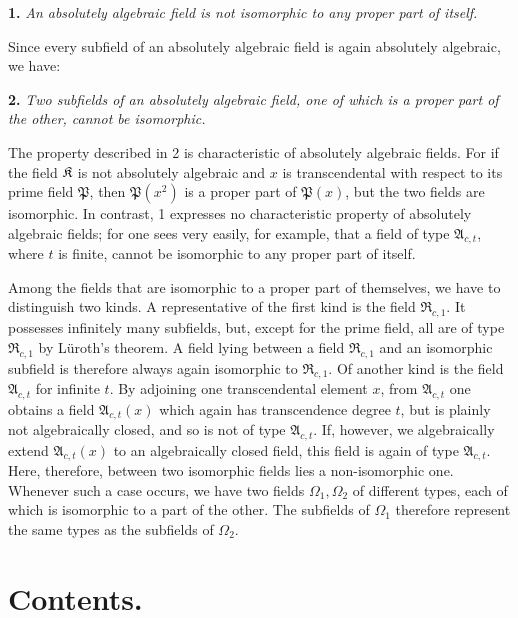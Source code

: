 \textbf{1.} \emph{An absolutely algebraic field is not isomorphic to any proper part of itself.}

Since every subfield of an absolutely algebraic field is again absolutely algebraic, we have:

\textbf{2.} \emph{Two subfields of an absolutely algebraic field, one of which is a proper part of the other, cannot be isomorphic.}

The property described in 2 is characteristic of absolutely algebraic fields. For if the field \(\mathfrak K\) is not absolutely algebraic and \(x\) is transcendental with respect to its prime field \(\mathfrak P\), then \(\mathfrak P(x^2)\) is a proper part of \(\mathfrak P(x)\), but the two fields are isomorphic. In contrast, 1 expresses no characteristic property of absolutely algebraic fields; for one sees very easily, for example, that a field of type \(\mathfrak A_{c,t}\), where \(t\) is finite, cannot be isomorphic to any proper part of itself.

Among the fields that are isomorphic to a proper part of themselves, we have to distinguish two kinds. A representative of the first kind is the field \(\mathfrak R_{c,1}\). It possesses infinitely many subfields, but, except for the prime field, all are of type \(\mathfrak R_{c,1}\) by Lüroth's theorem. A field lying between a field \(\mathfrak R_{c,1}\) and an isomorphic subfield is therefore always again isomorphic to \(\mathfrak R_{c,1}\). Of another kind is the field \(\mathfrak A_{c,t}\) for infinite \(t\). By adjoining one transcendental element \(x\), from \(\mathfrak A_{c,t}\) one obtains a field \(\mathfrak A_{c,t}(x)\) which again has transcendence degree \(t\), but is plainly not algebraically closed, and so is not of type \(\mathfrak A_{c,t}\). If, however, we algebraically extend \(\mathfrak A_{c,t}(x)\) to an algebraically closed field, this field is again of type \(\mathfrak A_{c,t}\). Here, therefore, between two isomorphic fields lies a non-isomorphic one. Whenever such a case occurs, we have two fields \(\Omega_1,\Omega_2\) of different types, each of which is isomorphic to a part of the other. The subfields of \(\Omega_1\) therefore represent the same types as the subfields of \(\Omega_2\).

\section*{Contents.}

